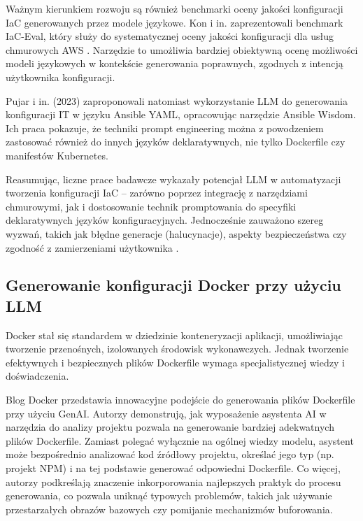 Ważnym kierunkiem rozwoju są również benchmarki oceny jakości konfiguracji IaC generowanych przez modele językowe. Kon i in. zaprezentowali benchmark IaC-Eval, który służy do systematycznej oceny jakości konfiguracji dla usług chmurowych AWS \cite{kon_iac-eval_nodate}. Narzędzie to umożliwia bardziej obiektywną ocenę możliwości modeli językowych w kontekście generowania poprawnych, zgodnych z intencją użytkownika konfiguracji.

Pujar i in. (2023) \cite{pujar_invited_2023} zaproponowali natomiast wykorzystanie LLM do generowania konfiguracji IT w języku Ansible YAML, opracowując narzędzie Ansible Wisdom. Ich praca pokazuje, że techniki prompt engineering można z powodzeniem zastosować również do innych języków deklaratywnych, nie tylko Dockerfile czy manifestów Kubernetes.

Reasumując, liczne prace badawcze wykazały potencjał LLM w automatyzacji tworzenia konfiguracji IaC – zarówno poprzez integrację z narzędziami chmurowymi, jak i dostosowanie technik promptowania do specyfiki deklaratywnych języków konfiguracyjnych. Jednocześnie zauważono szereg wyzwań, takich jak błędne generacje (halucynacje), aspekty bezpieczeństwa czy zgodność z zamierzeniami użytkownika \cite{malul_genkubesec_2024, kratzke_dont_2024}.

\subsection{Generowanie konfiguracji Docker przy użyciu LLM}

Docker stał się standardem w dziedzinie konteneryzacji aplikacji, umożliwiając tworzenie przenośnych, izolowanych środowisk wykonawczych. Jednak tworzenie efektywnych i bezpiecznych plików Dockerfile wymaga specjalistycznej wiedzy i doświadczenia.

Blog Docker \cite{docker_genai} przedstawia innowacyjne podejście do generowania plików Dockerfile przy użyciu GenAI. Autorzy demonstrują, jak wyposażenie asystenta AI w narzędzia do analizy projektu pozwala na generowanie bardziej adekwatnych plików Dockerfile. Zamiast polegać wyłącznie na ogólnej wiedzy modelu, asystent może bezpośrednio analizować kod źródłowy projektu, określać jego typ (np. projekt NPM) i na tej podstawie generować odpowiedni Dockerfile. Co więcej, autorzy podkreślają znaczenie inkorporowania najlepszych praktyk do procesu generowania, co pozwala uniknąć typowych problemów, takich jak używanie przestarzałych obrazów bazowych czy pomijanie mechanizmów buforowania.

